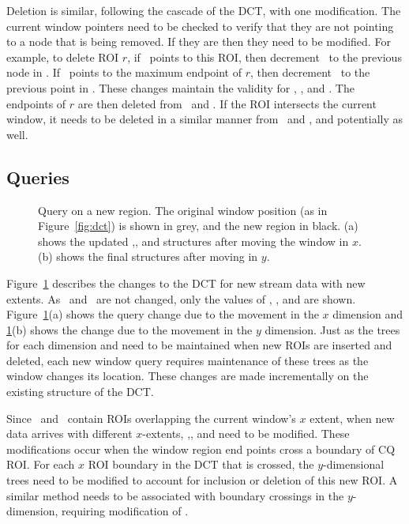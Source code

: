 \documentclass{ucdthesis}       %
\begin{document}
Deletion is similar, following the cascade of the \ac{DCT}, with one
modification.  The current window pointers need to be checked to
verify that they are not pointing to a node that is being removed.  If
they are then they need to be modified.  For example, to delete \ac{ROI}
$r$, if \wxx\ points to this \ac{ROI}, then decrement \wxx\ to the
previous node in \Xn.  If \wxn\ points to the maximum endpoint of $r$,
then decrement \wxn\ to the previous point in \Xx.  These changes
maintain the validity for \Yn, \Yx, and .  The endpoints of $r$ are
then deleted from \Xn\ and \Xx.  If the \ac{ROI} intersects the current
window, it needs to be deleted in a similar manner from \Yn\ and \Yx,
and potentially  as well.

\subsection{Queries}
\label{sec:query}

\begin{figure}[htb]
  \centering
  
  \caption[Query on a new region]{%
    Query on a new region. The original window position (as in
    Figure~\ref{fig:dct}) is shown in grey, and the new region in black.
    (a) shows the updated \Yn,\Yx, and  structures after moving the
    window in $x$.  (b) shows the final structures after moving
    in $y$.}
  \label{fig:update}
\end{figure}

Figure~\ref{fig:update} describes the changes to the \ac{DCT} for new
stream data with new extents.  As \Xn\ and \Xx\ are not changed, only
the values of \Yn, \Yx, and  are shown.  Figure~\ref{fig:update}(a)
shows the query change due to the movement in the $x$ dimension and
\ref{fig:update}(b) shows the change due to the movement in the $y$
dimension.  Just as the trees for each dimension and  need to be
maintained when new \acp{ROI} are inserted and deleted, each new window
query requires maintenance of these trees as the window changes its
location.  These changes are made incrementally on the existing
structure of the \ac{DCT}.

Since \Yn\ and \Yx\ contain \acp{ROI} overlapping the current window's
$x$ extent, when new data arrives with different $x$-extents,
\Yn,\Yx, and  need to be modified.  These modifications occur when
the window region end points cross a boundary of \ac{CQ} \ac{ROI}.  For
each $x$ \ac{ROI} boundary in the \ac{DCT} that is crossed, the
$y$-dimensional trees need to be modified to account for inclusion or
deletion of this new \ac{ROI}.  A similar method needs to be associated
with boundary crossings in the $y$-dimension,
requiring modification of .
\end{document}
